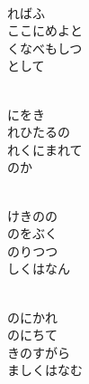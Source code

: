 \documentclass[10pt,b5j]{tarticle} %
\begin{document}
\begin{enumerate}
\begin{minipage}[c]{\blocksize}
    \end{minipage}
    \begin{minipage}[c]{\blocksize}
        
        \vspace{\linespace}
        \item~\\
        ればふ\\
        ここにめよと\\
        くなべもしつ\\
        として
        
    \end{minipage}
    \begin{minipage}[c]{\blocksize}
        
        \vspace{\linespace}
        \item~\\
        にをき\\
        れひたるの\\
        れくにまれて\\
        のか
        
    \end{minipage}
    \begin{minipage}[c]{\blocksize}
        
        \vspace{\linespace}
        \item~\\
        けきのの\\
        のをぶく\\
        のりつつ\\
        しくはなん
        
    \end{minipage}
    \begin{minipage}[c]{\blocksize}
        
        \vspace{\linespace}
        \item~\\
        のにかれ\\
        のにちて\\
        きのすがら\\
        ましくはなむ
    
    \end{minipage}
\end{enumerate} %
\end{document}
